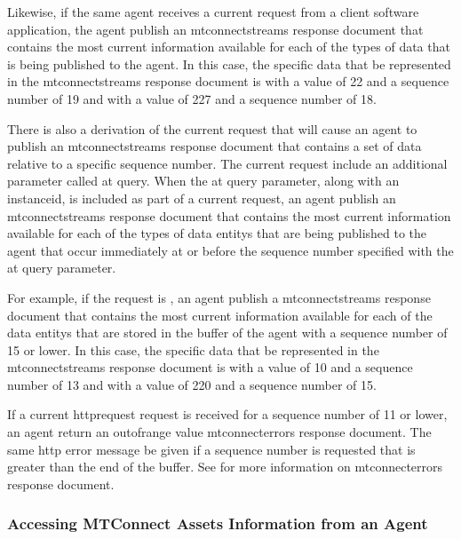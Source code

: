 \documentclass{mtconnect}	%
\begin{document}
Likewise, if the same \gls{agent} receives a \gls{current request} from a client software application, the \gls{agent} \MUST publish an \gls{mtconnectstreams response document} that contains the most current information available for each of the types of data that is being published to the \gls{agent}.  In this case, the specific data that \MUST be represented in the \gls{mtconnectstreams response document} is  with a value of 22 and a \gls{sequence number} of 19 and  with a value of 227 and a \gls{sequence number} of 18.

There is also a derivation of the \gls{current request} that will cause an \gls{agent} to publish an \gls{mtconnectstreams response document} that contains a set of data relative to a specific sequence number.  The \gls{current request} \MAY include an additional parameter called \gls{at query}.  When the \gls{at query} parameter, along with an \gls{instanceid}, is included as part of a \gls{current request}, an \gls{agent} \MUST publish an \gls{mtconnectstreams response document} that contains the most current information available for each of the types of \glspl{data entity} that are being published to the \gls{agent} that occur immediately at or before the \gls{sequence number} specified with the \gls{at query} parameter.

For example, if the \gls{request} is , an \gls{agent} \MUST publish a \gls{mtconnectstreams response document} that contains the most current information available for each of the \glspl{data entity} that are stored in the \gls{buffer} of the \gls{agent} with a \gls{sequence number} of 15 or lower.  In this case, the specific data that \MUST be represented in the \gls{mtconnectstreams response document} is  with a value of 10 and a \gls{sequence number} of 13 and  with a value of 220 and a \gls{sequence number} of 15.

If a \gls{current httprequest} \gls{request} is received for a \gls{sequence number} of 11 or lower, an \gls{agent} \MUST return an \gls{outofrange value} \gls{mtconnecterrors response document}.  The same \gls{http error message} \MUST be given if a \gls{sequence number} is requested that is greater than the end of the \gls{buffer}.  See  for more information on \gls{mtconnecterrors response document}.

\subsubsection{Accessing MTConnect Assets Information from an Agent}
\end{document}
